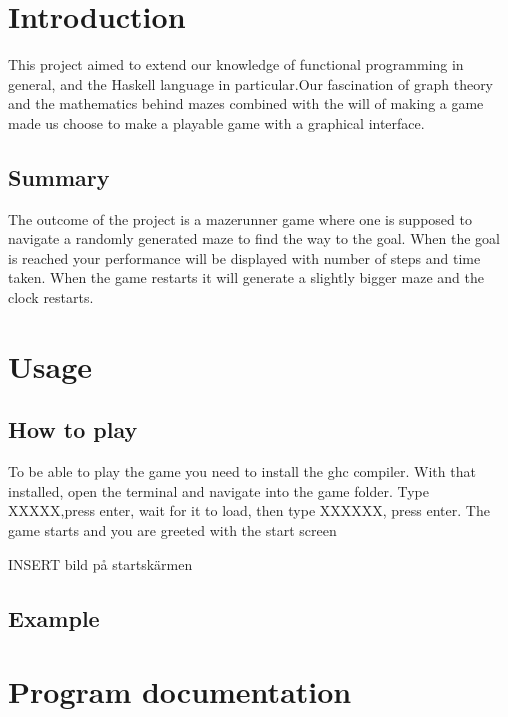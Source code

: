 \documentclass[12pt, a4paper]{article}
\begin{document}
\maketitle

\newpage


\tableofcontents


\newpage
\section{Introduction}
This project aimed to extend our knowledge of functional programming in general, and the Haskell language in particular.Our fascination of graph theory and the mathematics behind mazes combined with the will of making a game made us choose to make a playable game with a graphical interface.


\subsection{Summary}
The outcome of the project is a mazerunner game where one is supposed to navigate a randomly generated maze to find the way to the goal. When the goal is reached your performance will be displayed with number of steps and time taken. When the game restarts it will generate a slightly bigger maze and the clock restarts.


\section{Usage}
\subsection{How to play}
To be able to play the game you need to install the ghc compiler. With that installed, open the terminal and navigate into the game folder. Type XXXXX,press enter, wait for it to load, then type XXXXXX, press enter. The game starts and you are greeted with the start screen

INSERT bild på startskärmen

\subsection{Example}


\newpage
\section{Program documentation}
\end{document}
